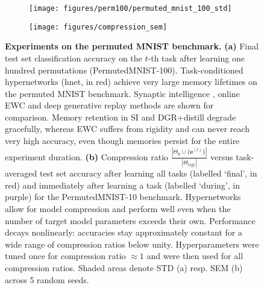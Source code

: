\documentclass{article}
\begin{document}
\begin{figure}
    \centering
    \begin{subfigure}{0.49\linewidth}
    \caption{}
    \texttt{[image: figures/perm100/permuted\_mnist\_100\_std]}
    \end{subfigure}
    \begin{subfigure}{0.49\linewidth}
    \caption{}
    \texttt{[image: figures/compression\_sem]}
    \end{subfigure}
    \caption{\textbf{Experiments on the permuted MNIST benchmark.} \textbf{(a)} Final test set classification accuracy on the $t$-th task after learning one hundred permutations (PermutedMNIST-100). Task-conditioned hypernetworks (hnet, in red) achieve very large memory lifetimes on the permuted MNIST benchmark. Synaptic intelligence \citep[SI, in blue;][]{zenke_continual_2017}, online EWC \citep[in orange;][]{schwarz_progress_2018} and deep generative replay \citep[DGR+distill, in green;][]{shin_continual_2017} methods are shown for comparison. Memory retention in SI and DGR+distill degrade gracefully,
whereas EWC suffers from rigidity and can never reach very high accuracy, even though memories persist for the entire experiment duration. \textbf{(b)} Compression ratio $\frac{|\Theta_\text{h} \cup \{\mathbf{e}^{(t)} \}|}{|\Theta_\text{trgt}|}$ versus task-averaged test set accuracy after learning all tasks (labelled `final', in red) and immediately after learning a task (labelled `during', in purple) for the PermutedMNIST-10 benchmark. Hypernetworks allow for model compression and perform well even when the number of target model parameters exceeds their own. Performance decays nonlinearly: accuracies stay approximately constant for a wide range of compression ratios below unity. Hyperparameters were tuned once for compression ratio $\approx 1$ and were then used for all compression ratios. Shaded areas denote STD (a) resp. SEM (b) across 5 random seeds.\label{fig:permutedMNIST}}
\end{figure}

\vspace{-2mm}
\end{document}
